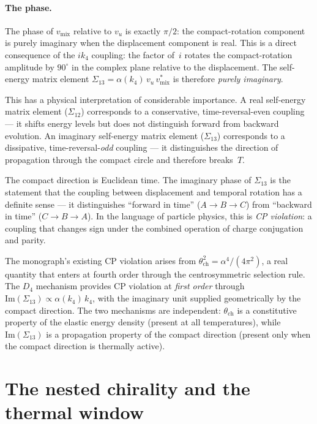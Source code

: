 \paragraph{The phase.}  The phase of $v_{\text{mix}}$ relative to $v_u$ is exactly $\pi/2$: the compact-rotation component is purely imaginary when the displacement component is real.  This is a direct consequence of the $ik_4$ coupling:  the factor of~$i$ rotates the compact-rotation amplitude by $90^\circ$ in the complex plane relative to the displacement.  The self-energy matrix element $\Sigma_{13} = \alpha(k_4)\,v_u\,v_{\text{mix}}^*$ is therefore \textit{purely imaginary}.

This has a physical interpretation of considerable importance.  A real self-energy matrix element ($\Sigma_{12}$) corresponds to a conservative, time-reversal-even coupling --- it shifts energy levels but does not distinguish forward from backward evolution.  An imaginary self-energy matrix element ($\Sigma_{13}$) corresponds to a dissipative, time-reversal-\textit{odd} coupling --- it distinguishes the direction of propagation through the compact circle and therefore breaks~$T$.

The compact direction is Euclidean time.  The imaginary phase of $\Sigma_{13}$ is the statement that the coupling between displacement and temporal rotation has a definite sense --- it distinguishes ``forward in time'' ($A \to B \to C$) from ``backward in time'' ($C \to B \to A$).  In the language of particle physics, this is \textit{CP violation}: a coupling that changes sign under the combined operation of charge conjugation and parity.

The monograph's existing CP violation arises from $\theta_{\text{ch}}^2 = \alpha^4/(4\pi^2)$, a real quantity that enters at fourth order through the centrosymmetric selection rule.  The $D_4$ mechanism provides CP violation at \textit{first order} through $\text{Im}(\Sigma_{13}) \propto \alpha(k_4)\,k_4$, with the imaginary unit supplied geometrically by the compact direction.  The two mechanisms are independent: $\theta_{\text{ch}}$ is a constitutive property of the elastic energy density (present at all temperatures), while $\text{Im}(\Sigma_{13})$ is a propagation property of the compact direction (present only when the compact direction is thermally active).


\section{The nested chirality and the thermal window}
\label{sec:nested_chirality}

